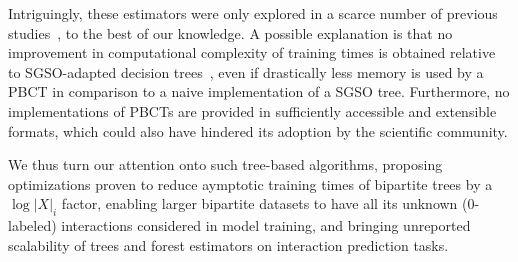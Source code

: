 %
%

Intriguingly, these estimators were only explored in a scarce number of previous studies~\cite{pliakos2018global,pliakos2019network,pliakos2020drugtarget}, to the best of our knowledge. A possible explanation is that no improvement in computational complexity of training times is obtained relative to SGSO-adapted decision trees~\cite{pliakos2018global}, even if drastically less memory is used by a PBCT in comparison to a naive implementation of a SGSO tree.  %
Furthermore, no implementations of PBCTs are provided in sufficiently accessible and extensible formats, which could also have hindered its adoption by the scientific community.

We thus turn our attention onto such tree-based algorithms, proposing optimizations proven to reduce aymptotic training times of bipartite trees by a $\log |X|_i$ factor, enabling larger bipartite datasets to have all its unknown (0-labeled) interactions considered in model training, and bringing unreported scalability of trees and forest estimators on interaction prediction tasks.

